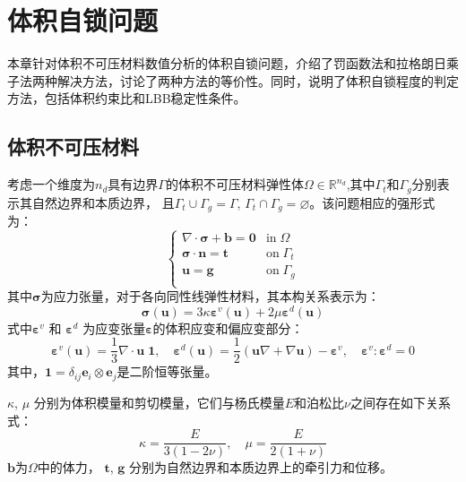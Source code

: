 \chapter{体积自锁问题}
本章针对体积不可压材料数值分析的体积自锁问题，介绍了罚函数法和拉格朗日乘子法两种解决方法，讨论了两种方法的等价性。同时，说明了体积自锁程度的判定方法，包括体积约束比和LBB稳定性条件。
\section{体积不可压材料}               
考虑一个维度为$n_d$具有边界$\Gamma$的体积不可压材料弹性体$\Omega\in \mathbb R^{n_d}$,其中$\Gamma_t$和$\Gamma_g$分别表示其自然边界和本质边界，
且$\Gamma_t \cup \Gamma_g = \Gamma$, $\Gamma_t \cap \Gamma_g = \varnothing$。该问题相应的强形式为：
\begin{equation}\label{strong_penalty}
    \begin{cases}
        \nabla \cdot \boldsymbol \sigma + \boldsymbol b = \boldsymbol 0 & \mathrm{in} \; \Omega \\
        \boldsymbol \sigma \cdot \boldsymbol n = \boldsymbol t & \mathrm{on} \; \Gamma_t \\
        \boldsymbol u = \boldsymbol g & \mathrm{on} \; \Gamma_g \\
\end{cases}
\end{equation}
其中$\boldsymbol \sigma$为应力张量，对于各向同性线弹性材料，其本构关系表示为：
\begin{equation}\label{stress_penalty}
    \boldsymbol \sigma(\boldsymbol u) = 3\kappa \boldsymbol \varepsilon^v(\boldsymbol u) + 2\mu \boldsymbol \varepsilon^d(\boldsymbol u) 
\end{equation}
式中$\boldsymbol \varepsilon^v$ 和 $\boldsymbol \varepsilon^d$ 为应变张量$\boldsymbol \varepsilon$的体积应变和偏应变部分：
\begin{equation}
    \boldsymbol \varepsilon^v(\boldsymbol u) =\frac{1}{3} \nabla \cdot \boldsymbol u \; \boldsymbol 1, \quad
    \boldsymbol \varepsilon^d(\boldsymbol u) =\frac{1}{2}(\boldsymbol u \nabla + \nabla \boldsymbol u) - \boldsymbol \varepsilon^v, \quad
    \boldsymbol \varepsilon^v : \boldsymbol \varepsilon^d = 0
\end{equation}
其中，$\boldsymbol 1 = \delta_{ij} \boldsymbol e_i \otimes \boldsymbol e_j$是二阶恒等张量。

$\kappa$, $\mu$ 分别为体积模量和剪切模量，它们与杨氏模量$E$和泊松比$\nu$之间存在如下关系式：
\begin{equation}\label{modulus}
    \kappa = \frac{E}{3(1-2\nu)}, \quad \mu = \frac{E}{2(1+\nu)}
\end{equation}
$\boldsymbol b$为$\Omega$中的体力， $\boldsymbol t$, $\boldsymbol g$ 分别为自然边界和本质边界上的牵引力和位移。

